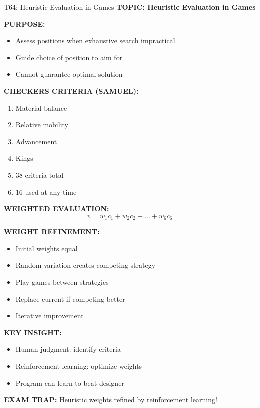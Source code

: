 \documentclass[8pt]{beamer}
\begin{document}
	\begin{frame}{T64: Heuristic Evaluation in Games}
		\fontsize{6.5}{7.5}\selectfont
		\textbf{TOPIC: Heuristic Evaluation in Games}
		
		\vspace{0.1cm}
		\textbf{PURPOSE:}
		\begin{itemize}
			\item Assess positions when exhaustive search impractical
			\item Guide choice of position to aim for
			\item Cannot guarantee optimal solution
		\end{itemize}
		
		\vspace{0.1cm}
		\textbf{CHECKERS CRITERIA (SAMUEL):}
		\begin{enumerate}
			\item Material balance
			\item Relative mobility
			\item Advancement
			\item Kings
			\item 38 criteria total
			\item 16 used at any time
		\end{enumerate}
		
		\vspace{0.1cm}
		\textbf{WEIGHTED EVALUATION:}
		\[
		v = w_1 c_1 + w_2 c_2 + ... + w_6 c_6
		\]
		
		\vspace{0.1cm}
		\textbf{WEIGHT REFINEMENT:}
		\begin{itemize}
			\item Initial weights equal
			\item Random variation creates competing strategy
			\item Play games between strategies
			\item Replace current if competing better
			\item Iterative improvement
		\end{itemize}
		
		\vspace{0.1cm}
		\textbf{KEY INSIGHT:}
		\begin{itemize}
			\item Human judgment: identify criteria
			\item Reinforcement learning: optimize weights
			\item Program can learn to beat designer
		\end{itemize}
		
		\textcolor{myred}{\textbf{EXAM TRAP:}} Heuristic weights \textcolor{myblue}{refined by reinforcement learning}!
	\end{frame}
	
\end{document}
